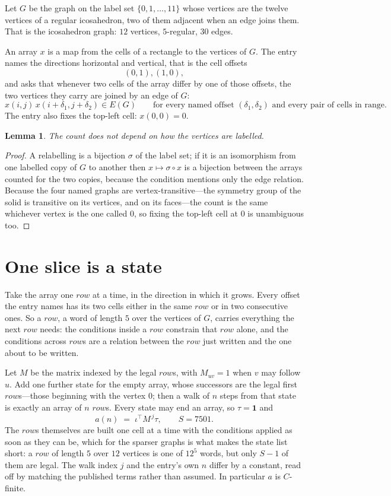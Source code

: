 \documentclass[11pt,a4paper]{article}
\theoremstyle{plain}
\newtheorem{lemma}[theorem]{Lemma}
\theoremstyle{definition}
\begin{document}
Let $G$ be the graph on the label set $\{0,1,\dots,11\}$ whose vertices are the twelve vertices of a regular icosahedron, two of them adjacent when an edge joins them. That is the icosahedron graph: $12$ vertices, $5$-regular, $30$ edges.

An array $x$ is a map from the cells of a rectangle to the vertices of $G$. The entry names the
directions horizontal and vertical, that is the cell offsets
\[
(0,1), (1,0),
\]
and asks that whenever two cells of the array differ by one of those offsets, the two vertices
they carry are joined by an edge of $G$:
\[
x(i,j)\,x(i+\delta_1,j+\delta_2)\in E(G)\qquad
\text{for every named offset } (\delta_1,\delta_2)\text{ and every pair of cells in range.}
\]
The entry also fixes the top-left cell: $x(0,0)=0$.

\begin{lemma}\label{lem:label}
The count does not depend on how the vertices are labelled.
\end{lemma}

\begin{proof}
A relabelling is a bijection $\sigma$ of the label set; if it is an isomorphism from one
labelled copy of $G$ to another then $x\mapsto\sigma\circ x$ is a bijection between the arrays
counted for the two copies, because the condition mentions only the edge relation.
Because the four named graphs are vertex-transitive---the symmetry group of the solid is transitive on its vertices, and on its faces---the count is the same whichever vertex is the one called $0$, so fixing the top-left cell at $0$ is unambiguous too.
\end{proof}

\section{One slice is a state}

Take the array one $row$ at a time, in the direction in which it grows.
Every offset the entry names has its two cells either in the same $row$ or in two
consecutive ones. So a $row$, a word of length $5$ over the vertices of $G$, carries
everything the next $row$ needs: the conditions inside a $row$ constrain that
$row$ alone, and the conditions across $row$s are a relation between the
$row$ just written and the one about to be written.

Let $M$ be the matrix indexed by the legal $row$s, with $M_{uv}=1$ when $v$ may
follow $u$. Add one further state for the empty array, whose successors are the legal first
$row$s---those beginning with the vertex $0$; then a walk of
$n$ steps from that state is exactly an array of $n$ $row$s. Every state may end an
array, so $\tau=\mathbf{1}$ and
\[
a(n)\;=\;\iota^{\!\top}M^{\,j}\tau ,\qquad S=7501.
\]
The $row$s themselves are built one cell at a time with the conditions applied as soon
as they can be, which for the sparser graphs is what makes the state list short: a $row$
of length $5$ over $12$ vertices is one of $12^{5}$ words, but only $S-1$ of them are
legal. The walk index $j$ and the entry's own $n$ differ by a constant, read off by matching the
published terms rather than assumed. In particular $a$ is $C$-finite.
\end{document}
